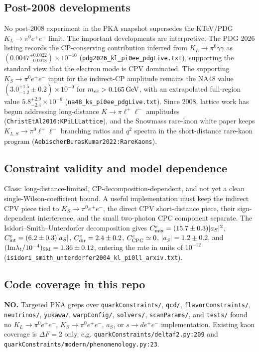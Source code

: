 \subsection*{Post-2008 developments}
No post-2008 experiment in the PKA snapshot supersedes the KTeV/PDG
\(K_L\to\pi^0 e^+e^-\) limit.  The important developments are interpretive.
The PDG 2026 listing records the CP-conserving contribution inferred from
\(K_L\to\pi^0\gamma\gamma\) as
\((0.0047^{+0.0022}_{-0.0018})\times10^{-10}\)
(\texttt{pdg2026\_kl\_pi0ee\_pdgLive.txt}), supporting the standard view that
the electron mode is CPV dominated.  The supporting \(K_S\to\pi^0e^+e^-\)
input for the indirect-CP amplitude remains the NA48 value
\((3.0^{+1.5}_{-1.2}\pm0.2)\times10^{-9}\) for \(m_{ee}>0.165\,{\rm GeV}\),
with an extrapolated full-region value
\(5.8^{+2.9}_{-2.4}\times10^{-9}\)
(\texttt{na48\_ks\_pi0ee\_pdgLive.txt}).  Since 2008, lattice work has begun
addressing long-distance \(K\to\pi\ell^+\ell^-\) amplitudes
(\texttt{ChristEtAl2016:KPiLLLattice}), and the Snowmass rare-kaon white paper
keeps \(K_{L,S}\to\pi^0\ell^+\ell^-\) branching ratios and \(q^2\) spectra in
the short-distance rare-kaon program
(\texttt{AebischerBurasKumar2022:RareKaons}).

\subsection*{Constraint validity and model dependence}
Class: long-distance-limited, CP-decomposition-dependent, and not yet a clean
single-Wilson-coefficient bound.  A useful implementation must keep the
indirect CPV piece tied to \(K_S\to\pi^0e^+e^-\), the direct CPV short-distance
piece, their sign-dependent interference, and the small two-photon CPC
component separate.  The Isidori--Smith--Unterdorfer decomposition gives
\(C_{\rm mix}^e=(15.7\pm0.3)|a_S|^2\), \(C_{\rm int}^e=(6.2\pm0.3)|a_S|\),
\(C_{\rm dir}^e=2.4\pm0.2\), \(C_{\rm CPC}^e\simeq0\),
\(|a_S|=1.2\pm0.2\), and
\(({\rm Im}\lambda_t/10^{-4})_{\rm SM}=1.36\pm0.12\), entering the rate in
units of \(10^{-12}\)
(\texttt{isidori\_smith\_unterdorfer2004\_kl\_pi0ll\_arxiv.txt}).

\subsection*{Code coverage in this repo}
\textbf{NO.}  Targeted PKA greps over \texttt{quarkConstraints/}, \texttt{qcd/},
\texttt{flavorConstraints/}, \texttt{neutrinos/}, \texttt{yukawa/},
\texttt{warpConfig/}, \texttt{solvers/}, \texttt{scanParams/}, and
\texttt{tests/} found no \(K_L\to\pi^0 e^+e^-\), \(K_S\to\pi^0e^+e^-\),
\(a_S\), or \(s\to d e^+e^-\) implementation.  Existing kaon coverage is
\(\Delta F=2\) only, e.g. \texttt{quarkConstraints/deltaf2.py:209} and
\texttt{quarkConstraints/modern/phenomenology.py:23}.

